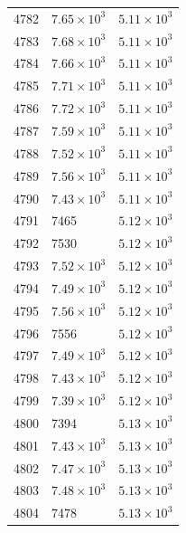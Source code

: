 \begin{table}[H]
\begin{tabular}{lll}
4782 & $\displaystyle 7.65 \times 10^{3}$ & $\displaystyle 5.11 \times 10^{3}$ \\
4783 & $\displaystyle 7.68 \times 10^{3}$ & $\displaystyle 5.11 \times 10^{3}$ \\
4784 & $\displaystyle 7.66 \times 10^{3}$ & $\displaystyle 5.11 \times 10^{3}$ \\
4785 & $\displaystyle 7.71 \times 10^{3}$ & $\displaystyle 5.11 \times 10^{3}$ \\
4786 & $\displaystyle 7.72 \times 10^{3}$ & $\displaystyle 5.11 \times 10^{3}$ \\
4787 & $\displaystyle 7.59 \times 10^{3}$ & $\displaystyle 5.11 \times 10^{3}$ \\
4788 & $\displaystyle 7.52 \times 10^{3}$ & $\displaystyle 5.11 \times 10^{3}$ \\
4789 & $\displaystyle 7.56 \times 10^{3}$ & $\displaystyle 5.11 \times 10^{3}$ \\
4790 & $\displaystyle 7.43 \times 10^{3}$ & $\displaystyle 5.11 \times 10^{3}$ \\
4791 & 7465 & $\displaystyle 5.12 \times 10^{3}$ \\
4792 & 7530 & $\displaystyle 5.12 \times 10^{3}$ \\
4793 & $\displaystyle 7.52 \times 10^{3}$ & $\displaystyle 5.12 \times 10^{3}$ \\
4794 & $\displaystyle 7.49 \times 10^{3}$ & $\displaystyle 5.12 \times 10^{3}$ \\
4795 & $\displaystyle 7.56 \times 10^{3}$ & $\displaystyle 5.12 \times 10^{3}$ \\
4796 & 7556 & $\displaystyle 5.12 \times 10^{3}$ \\
4797 & $\displaystyle 7.49 \times 10^{3}$ & $\displaystyle 5.12 \times 10^{3}$ \\
4798 & $\displaystyle 7.43 \times 10^{3}$ & $\displaystyle 5.12 \times 10^{3}$ \\
4799 & $\displaystyle 7.39 \times 10^{3}$ & $\displaystyle 5.12 \times 10^{3}$ \\
4800 & 7394 & $\displaystyle 5.13 \times 10^{3}$ \\
4801 & $\displaystyle 7.43 \times 10^{3}$ & $\displaystyle 5.13 \times 10^{3}$ \\
4802 & $\displaystyle 7.47 \times 10^{3}$ & $\displaystyle 5.13 \times 10^{3}$ \\
4803 & $\displaystyle 7.48 \times 10^{3}$ & $\displaystyle 5.13 \times 10^{3}$ \\
4804 & 7478 & $\displaystyle 5.13 \times 10^{3}$ \\

\end{tabular}
\end{table}
